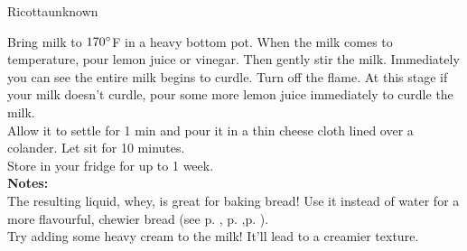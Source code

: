 \begin{recipe}{Ricotta}{unknown}{}



    Bring milk to $170\degree$F in a heavy bottom pot. When the milk comes to temperature, pour lemon juice or vinegar. Then gently stir the milk. Immediately you can see the entire milk begins to curdle. Turn off the flame. At this stage if your milk doesn't curdle, pour some more lemon juice immediately to curdle the milk.\\

    Allow it to settle for 1 min and pour it in a thin cheese cloth lined over a colander. Let sit for 10 minutes.\\

    Store in your fridge for up to 1 week.\\

    \textbf{Notes:}\\

    The resulting liquid, whey, is great for baking bread! Use it instead of water for a more flavourful, chewier bread (see p. \pageref{bread:noknead}, p. \pageref{bread:focaccia},p. \pageref{components:pizza_dough}).\\

    Try adding some heavy cream to the milk! It'll lead to a creamier texture.

\end{recipe}